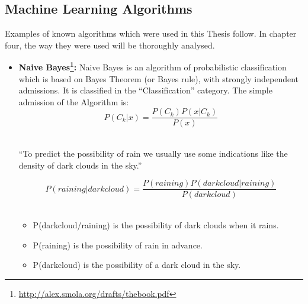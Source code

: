 \subsection{Machine Learning Algorithms}\label{212_ref}
Examples of known algorithms which were used in this Thesis follow. In chapter four, the way they were used will be thoroughly analysed.\\
\begin{itemize}

	\item \textbf{Naive Bayes\footnote{\url{http://alex.smola.org/drafts/thebook.pdf}}:} Naive Bayes is an algorithm of probabilistic classification which is based on Bayes Theorem (or Bayes rule), with strongly independent admissions. It is classified in the ``Classification'' category. The simple admission of the Algorithm is:\\

\begin{equation}
P\left(C_{k}|x\right)=\frac{P\left(C_{k}\right)P\left(x|C_{k}\right)}{P\left(x\right)}
\end{equation}
\\
\begin{example}
	``To predict the possibility of rain we usually use some indications like the density of dark clouds in the sky.''\\
\end{example}

\begin{equation}
P\left(raining|darkcloud\right)=\frac{P\left(raining\right)P\left(darkcloud|raining\right)}{P\left(darkcloud\right)}
\end{equation}
\\
\begin{itemize}

	\item P(darkcloud/raining) is the possibility of dark clouds when it rains.
	\item P(raining) is the possibility of rain in advance.
	\item P(darkcloud) is the possibility of a dark cloud in the sky.\\

\end{itemize}



\end{itemize}
